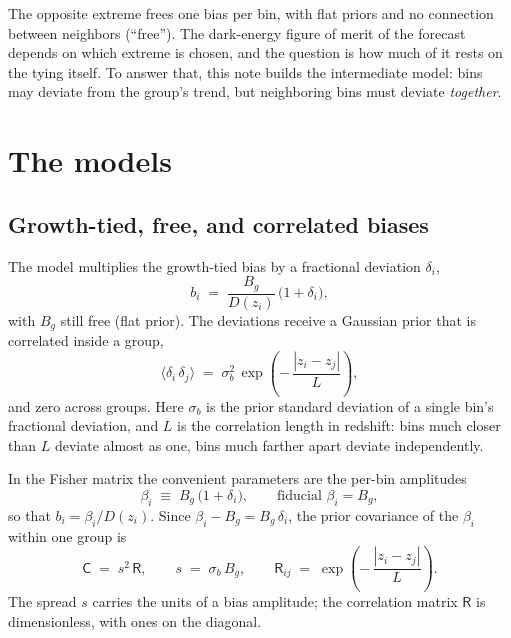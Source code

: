 \documentclass[11pt]{article}
\newcommand{\Cov}{\mathsf{C}}
\begin{document}
The opposite extreme frees one bias per bin, with flat priors and no
connection between neighbors (``free'').  The dark-energy figure of
merit of the forecast depends on which extreme is chosen, and the
question is how much of it rests on the tying itself.  To answer that,
this note builds the intermediate model: bins may deviate from the
group's trend, but neighboring bins must deviate \emph{together}.

\section{The models}
\label{sec:models}

\subsection{Growth-tied, free, and correlated biases}
\label{sec:defs}

The model multiplies the growth-tied bias by a fractional deviation
$\delta_i$,
\begin{equation}
  b_i \;=\; \frac{B_g}{D(z_i)}\,\bigl(1 + \delta_i\bigr),
  \label{eq:model}
\end{equation}
with $B_g$ still free (flat prior).  The deviations receive a Gaussian
prior that is correlated inside a group,
\begin{equation}
  \bigl\langle \delta_i\,\delta_j \bigr\rangle
  \;=\; \sigma_b^2\,
  \exp\!\left(-\,\frac{|z_i - z_j|}{L}\right),
  \label{eq:priorkernel}
\end{equation}
and zero across groups.  Here $\sigma_b$ is the prior standard deviation
of a single bin's fractional deviation, and $L$ is the correlation
length in redshift: bins much closer than $L$ deviate almost as one,
bins much farther apart deviate independently.

In the Fisher matrix the convenient parameters are the per-bin
amplitudes
\begin{equation}
  \beta_i \;\equiv\; B_g\,\bigl(1 + \delta_i\bigr),
  \qquad \text{fiducial } \beta_i = B_g,
  \label{eq:beta}
\end{equation}
so that $b_i = \beta_i / D(z_i)$.  Since $\beta_i - B_g = B_g\,\delta_i$,
the prior covariance of the $\beta_i$ within one group is
\begin{equation}
  \Cov \;=\; s^2\,\mathsf{R},
  \qquad
  s \;=\; \sigma_b\,B_g,
  \qquad
  \mathsf{R}_{ij} \;=\; \exp\!\left(-\,\frac{|z_i - z_j|}{L}\right).
  \label{eq:covdef}
\end{equation}
The spread $s$ carries the units of a bias amplitude; the correlation
matrix $\mathsf{R}$ is dimensionless, with ones on the diagonal.
\end{document}

